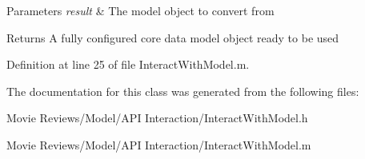 \begin{DoxyParams}{Parameters}
{\em result} & The model object to convert from\\
\hline
\end{DoxyParams}
\begin{DoxyReturn}{Returns}
A fully configured core data model object ready to be used 
\end{DoxyReturn}


Definition at line 25 of file Interact\+With\+Model.\+m.



The documentation for this class was generated from the following files\+:\begin{DoxyCompactItemize}
\item 
Movie Reviews/\+Model/\+A\+P\+I Interaction/Interact\+With\+Model.\+h\item 
Movie Reviews/\+Model/\+A\+P\+I Interaction/Interact\+With\+Model.\+m\end{DoxyCompactItemize}
